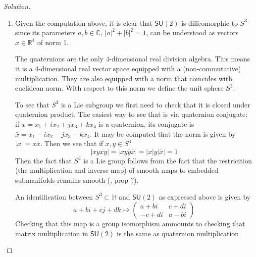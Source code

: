 \begin{proof}[Solution]\leavevmode
	\begin{enumerate}[label=\alph*.]
		\item Given the computation {\color{2}above}, it is clear that $\mathsf{SU}(2)$ is diffeomorphic to $S^3$ since its parameters $a,b\in\mathbb{C}$, $|a|^2+|b|^2=1$, can be understood as vectors $x\in\mathbb{R}^{4}$ of norm 1.

		The quaternions are the only 4-dimensional real division algebra. This means it is a 4-dimensional real vector space equipped with a (non-commutative) multiplication. They are also equipped with a norm that coincides with euclidean norm. With respect to this norm we define the unit sphere $S^3$. 
		
			To see that $S^3$ is a Lie subgroup we first need to check that it is closed under quaternion product. The easiest way to see that is via quaternion conjugate: if $x=x_1+ix_2+jx_3+kx_4$ is a quaternion, its conjugate is $\bar{x}=x_1-ix_2-jx_3-kx_4$. It may be computed that the norm is given by $|x| =x\bar{x}$. Then we see that if $x,y\in S^3$
			\[|xy\overline{xy}|=|xy\bar{y}\bar{x}| =\Big|x|y| \bar{x}\Big|=1\]
			Then the fact that $S^3$ is a Lie group follows from the fact that the restricition (the multiplication and inverse map) of smooth maps to embedded submanifolds remains smooth (\cite{lee}, prop ?).

			An identification between $S^3\subset \mathbb{H}$ and $\mathsf{SU}(2)$ as expressed above is given by
			\[a+bi+cj+dk\longmapsto \begin{pmatrix} a+bi&c+di\\-c+di&a-bi\end{pmatrix} \]
			Checking that this map is a group isomorphism ammounts to checking that matrix multiplication in $\mathsf{SU}(2)$ is the same as quaternion multiplication 



\end{enumerate}
\end{proof}
